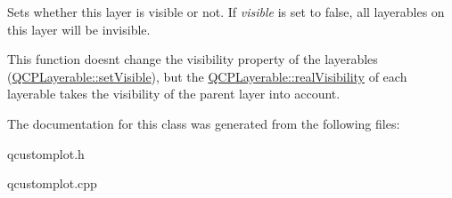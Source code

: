 Sets whether this layer is visible or not. If {\itshape visible} is set to false, all layerables on this layer will be invisible.

This function doesn\textquotesingle{}t change the visibility property of the layerables (\hyperlink{classQCPLayerable_a3bed99ddc396b48ce3ebfdc0418744f8}{Q\+C\+P\+Layerable\+::set\+Visible}), but the \hyperlink{classQCPLayerable_ab054e88f15d485defcb95e7376f119e7}{Q\+C\+P\+Layerable\+::real\+Visibility} of each layerable takes the visibility of the parent layer into account. 

The documentation for this class was generated from the following files\+:\begin{DoxyCompactItemize}
\item 
qcustomplot.\+h\item 
qcustomplot.\+cpp\end{DoxyCompactItemize}
